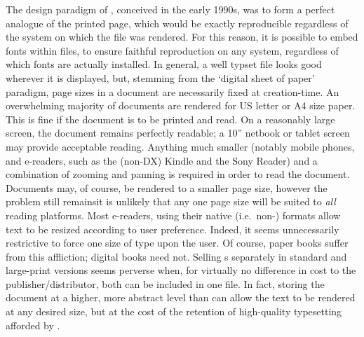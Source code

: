 The design paradigm of \pdf{}, conceived in the early 1990s\cite{Warnock1991}, was to form a perfect
analogue of the printed page, which would be exactly reproducible regardless of the system on which
the file was rendered. For this reason, it is possible to embed fonts within \pdf{} files, to ensure
faithful reproduction on any system, regardless of which fonts are actually installed. In general, a
well typset \pdf{} file looks good wherever it is displayed, but, stemming from the `digital sheet
of paper' paradigm, page sizes in a \pdf{} document are necessarily fixed at creation-time. An
overwhelming majority of \pdf{} documents are rendered for  US letter or A4 size paper. This is fine
if the document is to be printed and read. On a reasonably large screen, the document remains
perfectly readable; a 10'' netbook or tablet screen may provide acceptable reading. Anything much
smaller (notably mobile phones, and e-readers, such as the (non-DX) Kindle and the Sony Reader) and
a combination of zooming and panning is required 
in order to read the document. Documents may, of course, be rendered to a smaller page size, however
the problem still remains\ed it is unlikely that any one page size will be suited to \emph{all}
reading platforms. Most e-readers, using their native (i.e.\ non-\pdf{}) formats allow text to be
resized according to user preference. Indeed, it seems unnecessarily restrictive to force one size
of type upon the user. Of course, paper books suffer from this affliction; digital books need not.
Selling \ebook{}s separately in standard and large-print versions seems perverse when, for virtually
no difference in cost to the publisher/distributor, both can be included in one file. In fact,
storing the document at a higher, more abstract level than \pdf{} can allow the text to be rendered
at any desired size, but at the cost of the retention of high-quality typesetting afforded by
\pdf{}.


